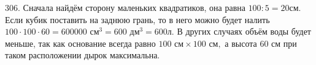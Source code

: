 306. Сначала найдём сторону маленьких квадратиков, она равна $100:5=20$см. Если кубик поставить на заднюю грань, то в него можно будет налить $100\cdot100\cdot60=600000\text{ см}^3=600\text{ дм}^3=600$л. В других случаях объём воды будет меньше, так как основание всегда равно $100\text{ см}\times100\text{ см},$ а высота 60 см при таком расположении дырок максимальна.\\
